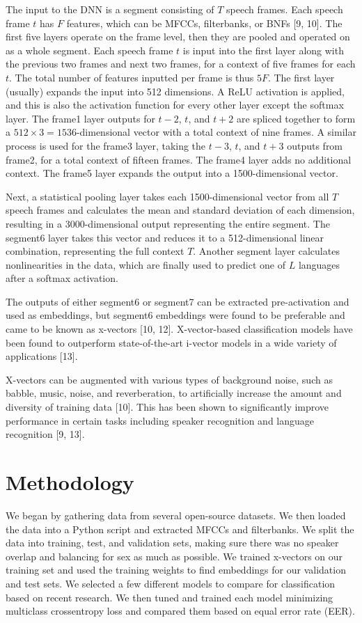 \documentclass{llncs}
\begin{document}
The input to the DNN is a segment consisting of $T$ speech frames. Each speech frame $t$ has $F$ features, which can be MFCCs, filterbanks, or BNFs [9, 10]. The first five layers operate on the frame level, then they are pooled and operated on as a whole segment. Each speech frame $t$ is input into the first layer along with the previous two frames and next two frames, for a context of five frames for each $t$. The total number of features inputted per frame is thus $5F$. The first layer (usually) expands the input into 512 dimensions. A ReLU activation is applied, and this is also the activation function for every other layer except the softmax layer. The frame1 layer outputs for $t-2$, $t$, and $t+2$ are spliced together to form a $512\times3=1536$-dimensional vector with a total context of nine frames. A similar process is used for the frame3 layer, taking the $t-3$, $t$, and $t+3$ outputs from frame2, for a total context of fifteen frames. The frame4 layer adds no additional context. The frame5 layer expands the output into a 1500-dimensional vector.

Next, a statistical pooling layer takes each 1500-dimensional vector from all $T$ speech frames and calculates the mean and standard deviation of each dimension, resulting in a 3000-dimensional output representing the entire segment. The segment6 layer takes this vector and reduces it to a 512-dimensional linear combination, representing the full context $T$. Another segment layer calculates nonlinearities in the data, which are finally used to predict one of $L$ languages after a softmax activation.

The outputs of either segment6 or segment7 can be extracted pre-activation and used as embeddings, but segment6 embeddings were found to be preferable and came to be known as x-vectors [10, 12]. X-vector-based classification models have been found to outperform state-of-the-art i-vector models in a wide variety of applications [13].

X-vectors can be augmented with various types of background noise, such as babble, music, noise, and reverberation, to artificially increase the amount and diversity of training data [10]. This has been shown to significantly improve performance in certain tasks including speaker recognition and language recognition [9, 13].

\section{Methodology}
We began by gathering data from several open-source datasets. We then loaded the data into a Python script and extracted MFCCs and filterbanks. We split the data into training, test, and validation sets, making sure there was no speaker overlap and balancing for sex as much as possible. We trained x-vectors on our training set and used the training weights to find embeddings for our validation and test sets. We selected a few different models to compare for classification based on recent research. We then tuned and trained each model minimizing multiclass crossentropy loss and compared them based on equal error rate (EER).
\end{document}
